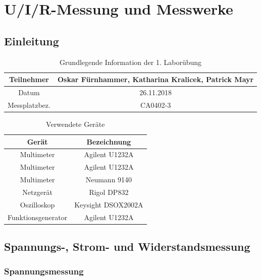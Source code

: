 \chapter{U/I/R-Messung und Messwerke}
\section{Einleitung}

\begin{table}[h]
	\centering
	\begin{tabular}{|c|c|}
		\hline 
		Teilnehmer 		& Oskar Fürnhammer, Katharina Kralicek, Patrick Mayr \\
		\hline 
		Datum 		& 26.11.2018 \\ 
		\hline 
		Messplatzbez. 	& CA0402-3 \\
		\hline
	\end{tabular} 
	\caption{Grundlegende Information der 1. Laborübung}
\end{table}

\begin{table}[h]
	\centering
	\begin{tabular}{ c | c }

Gerät				& Bezeichnung		\\
\hline

Multimeter			& Agilent U1232A 		\\
Multimeter			& Agilent U1232A 		\\
Multimeter			& Neumann 9140	 	\\
Netzgerät			& Rigol DP832 		\\
Oszilloskop			& Keysight DSOX2002A 	\\
Funktionsgenerator		& Agilent U1232A 		\\

	\end{tabular}

	\caption{Verwendete Geräte}

\end{table}

\newpage

\section{Spannungs-, Strom- und Widerstandsmessung}

\subsection{Spannungsmessung}
